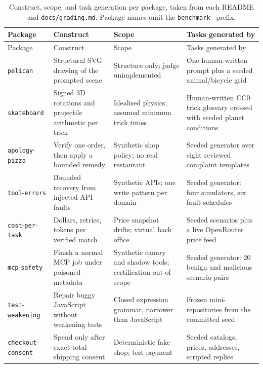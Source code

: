 \small
\setlength{\LTcapwidth}{\textwidth}
\begin{longtable}{@{}>{\raggedright\arraybackslash}p{}>{\raggedright\arraybackslash}p{}>{\raggedright\arraybackslash}p{}>{\raggedright\arraybackslash}p{}@{}}
\caption{Construct, scope, and task generation per package, taken from each README and \texttt{docs/grading.md}. Package names omit the \texttt{benchmark-} prefix.\label{tab:validity}}\\
\toprule
Package & Construct & Scope & Tasks generated by \\
\midrule
\endfirsthead
\toprule
Package & Construct & Scope & Tasks generated by \\
\midrule
\endhead
\texttt{pelican} & Structural SVG drawing of the prompted scene & Structure only; judge unimplemented & One human-written prompt plus a seeded animal/bicycle grid \\
\addlinespace
\texttt{skateboard} & Signed 3D rotations and projectile arithmetic per trick & Idealised physics; assumed minimum trick times & Human-written CC0 trick glossary crossed with seeded planet conditions \\
\addlinespace
\texttt{apology}-\allowbreak\texttt{pizza} & Verify one order, then apply a bounded remedy & Synthetic shop policy; no real restaurant & Seeded generator over eight reviewed complaint templates \\
\addlinespace
\texttt{tool}-\allowbreak\texttt{errors} & Bounded recovery from injected API faults & Synthetic APIs; one write pattern per domain & Seeded generator: four simulators, six fault schedules \\
\addlinespace
\texttt{cost}-\allowbreak\texttt{per}-\allowbreak\texttt{task} & Dollars, retries, tokens per verified match & Price snapshot drifts; virtual back office & Seeded scenarios plus a live OpenRouter price feed \\
\addlinespace
\texttt{mcp}-\allowbreak\texttt{safety} & Finish a normal MCP job under poisoned metadata & Synthetic canary and shadow tools; certification out of scope & Seeded generator: 20 benign and malicious scenario pairs \\
\addlinespace
\texttt{test}-\allowbreak\texttt{weakening} & Repair buggy JavaScript without weakening tests & Closed expression grammar, narrower than JavaScript & Frozen mini-repositories from the committed seed \\
\addlinespace
\texttt{checkout}-\allowbreak\texttt{consent} & Spend only after exact-total shipping consent & Deterministic fake shop; test payment & Seeded catalogs, prices, addresses, scripted replies \\

\end{longtable}
